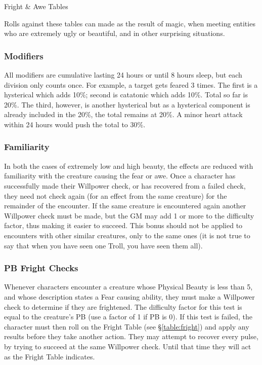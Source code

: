 \begin{Tables}{Fright \& Awe Tables}

\begin{multicols}{3}
    
Rolls against these tables can made as the result of magic, when
meeting entities who are extremely ugly or beautiful, and in other
surprising situations.

\subsubsection{Modifiers}

All modifiers are cumulative lasting 24 hours or until 8 hours sleep,
but each division only counts once.  For example, a target gets feared
3 times.  The first is a hysterical which adds 10\%; second is
catatonic which adds 10\%.  Total so far is 20\%.  The third, however,
is another hysterical but as a hysterical component is already
included in the 20\%, the total remains at 20\%.  A minor heart attack
within 24 hours would push the total to 30\%.

\subsubsection{Familiarity}

In both the cases of extremely low and high beauty, the effects are
reduced with familiarity with the creature causing the fear or awe.
Once a character has successfully made their Willpower check, or has
recovered from a failed check, they need not check again (for an
effect from the same creature) for the remainder of the encounter.  If
the same creature is encountered again another Willpower check must be
made, but the GM may add 1 or more to the difficulty factor, thus
making it easier to succeed.  This bonus should not be applied to
encounters with other similar creatures, only to the
same ones (it is not true to say that when you have 
seen one Troll, you have seen them all). 

\subsubsection{PB Fright Checks}

Whenever characters encounter a creature whose Physical Beauty is less
than 5, and whose description states a Fear causing ability, they must
make a Willpower check to determine if they are frightened.  The
difficulty factor for this test is equal to the creature’s PB (use a
factor of 1 if PB is 0).  If this test is failed, the character must
then roll on the Fright Table (see \S\ref{table:fright}) and apply any
results before they take another action. They may attempt to recover
every pulse, by trying to succeed at the same Willpower check.  Until
that time they will act as the Fright Table indicates.


\end{multicols}
\end{Tables}
